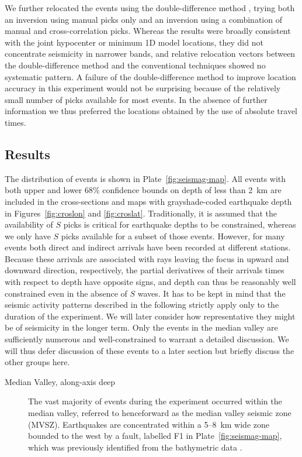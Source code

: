 \documentclass[aguplus]{aguplus}
\newlength{\tw}
\begin{document}
\begin{article}
We further relocated the events using the
double-difference method \citep{waldhauser00}, trying both an inversion using manual
picks only and an inversion using a  combination of manual and cross-correlation picks.  Whereas the results
were broadly consistent with the joint hypocenter or minimum 1D model
locations, they did not concentrate seismicity in narrower bands, and
relative relocation vectors between the double-difference method and
the conventional techniques showed no systematic pattern.  A failure
of the double-difference method to improve location accuracy in this
experiment would not be surprising
because of the relatively small number of picks available for most
events. In the absence of further information we thus preferred the
locations obtained by the use of absolute travel times.

\subsection{Results}

The distribution of events is shown in
Plate~\ref{fig:seismag-map}. All events with both upper
and lower 68\% confidence bounds on depth of less than 2~km are
included in the cross-sections and maps with grayshade-coded earthquake
depth in Figures~\ref{fig:croslon} and \ref{fig:croslat}.
Traditionally, it is assumed that the availability of $S$ picks is
critical for earthquake depths to be constrained, whereas we only have
$S$ picks available for a subset of those events.  However, for many
events both direct and indirect arrivals have been recorded at
different stations.  Because these arrivals are associated with rays leaving
the focus in upward and downward direction, respectively, the
partial derivatives of their arrivals times with respect to depth have
opposite signs, and depth can thus be reasonably well constrained even
in the absence of $S$ waves.
It has to be kept in mind that the seismic activity patterns described
in the following strictly apply only to the duration of the
experiment. We will later consider how representative they might be of
seismicity in the longer term.  Only the events in the median valley
are sufficiently numerous and well-constrained to warrant a detailed
discussion.  We will thus defer discussion of these events to a later
section but briefly discuss the other groups here.
\begin{description}
\item[Median Valley, along-axis deep]  The vast majority of events during the
experiment occurred within the median valley, referred to henceforward
as the median valley seismic zone (MVSZ).  Earthquakes are
concentrated within a 5--8~km wide zone bounded to the west by a
fault, labelled F1 in Plate~\ref{fig:seismag-map}, which was
previously identified from the bathymetric data \citep{reston02}.


\end{description}
\end{article}
\end{document}

